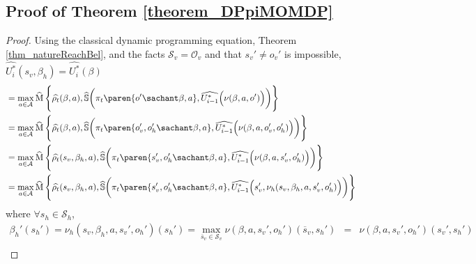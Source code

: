 \subsection{Proof of Theorem \ref{theorem_DPpiMOMDP}}
\label{theorem_DPpiMOMDP_RETURN}
\begin{proof}
Using the classical dynamic programming equation, Theorem \ref{thm_natureReachBel}, and the facts $\mathcal{S}_v=\mathcal{O}_v$ and that $s_v'\neq o_v'$ is impossible,\\
$\widehat{U_i^*}(s_v,\beta_h) = \widehat{U_i^*}(\beta)$
\begin{align*}
&= \max_{a \in \mathcal{A}} \operatorname*{\widehat{M}} \Bigg\{ \widehat{\rho_t}(\beta,a), \widehat{\mathbb{S}}\bigg( \pi_t \paren{o' \sachant \beta, a}, \widehat{U^*_{i-1}} \Big( \nu( \beta,a,o') \Big) \bigg) \Bigg\} \\
&= \max_{a \in \mathcal{A}} \operatorname*{\widehat{M}} \Bigg\{ \widehat{\rho_t}(\beta,a), \widehat{\mathbb{S}}\bigg( \pi_t \paren{o_v',o_h' \sachant \beta, a}, \widehat{U^*_{i-1}} \Big( \nu(\beta,a,o_v',o_h') \Big) \bigg) \Bigg\} \\
&= \max_{a \in \mathcal{A}} \operatorname*{\widehat{M}} \Bigg\{ \widehat{\rho_t}(s_v,\beta_h,a), \widehat{\mathbb{S}}\bigg( \pi_t \paren{s_v',o_h' \sachant \beta, a}, \widehat{U^*_{i-1}} \Big( \nu(\beta,a,s_v',o_h') \Big) \bigg) \Bigg\} \\
&= \max_{a \in \mathcal{A}} \operatorname*{\widehat{M}} \Bigg\{ \widehat{\rho_t}(s_v,\beta_h,a), \widehat{\mathbb{S}}\bigg( \pi_t \paren{s_v',o_h' \sachant \beta, a}, \widehat{U^*_{i-1}} \Big(s_v', \nu_h(s_v,\beta_h,a,s_v',o_h') \Big) \bigg) \Bigg\} 
\end{align*}
where $\forall s_h \in \mathcal{S}_h$, 
\begin{eqnarray*}
\beta_h'(s_h') = \nu_h(s_v,\beta_h,a,s_v',o_h')(s_h')= \max_{\overline{s}_v \in \mathcal{S}_v} \nu(\beta,a,s_v',o_h')(\overline{s}_v,s_h') & = & \nu(\beta,a,s_v',o_h')(s_v',s_h')\\

\end{eqnarray*}
\end{proof}

